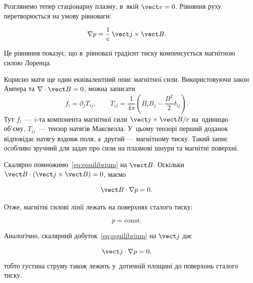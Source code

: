 Розглянемо тепер стаціонарну плазму, в~якій $\vect v=0$. Рівняння руху перетворюється на
умову рівноваги:

\begin{equation}\label{eq:equilibrium}
    \nabla p
    =
    \frac{1}{c}\,\vect j\times\vect B.
\end{equation}

Це рівняння показує, що в~рівновазі градієнт тиску компенсується магнітною силою Лоренца.

Корисно мати ще один еквівалентний опис магнітної сили. Використовуючи закон Ампера та
$\nabla\cdot\vect B=0$, можна записати
\begin{equation}\label{eq:maxwell-stress}
    f_i=\partial_jT_{ij},
    \qquad
    T_{ij}=
    \frac{1}{4\pi}
    \left(B_iB_j-\frac{B^2}{2}\delta_{ij}\right).
\end{equation}
Тут $f_i$~--- $i$-та компонента магнітної сили $\vect j\times\vect B/c$ на~одиницю об'єму, $T_{ij}$~--- тензор натягів Максвелла. У~цьому тензорі перший доданок відповідає натягу вздовж поля, а~другий --- магнітному
тиску. Такий запис особливо зручний для задач про сили на плазмові шнури та магнітні
поверхні.

Скалярно помножимо~\eqref{eq:equilibrium} на $\vect B$. Оскільки $\vect B\cdot(\vect
j\times\vect B)=0$, маємо

\begin{equation*}
    \vect B\cdot\nabla p=0.
\end{equation*}

Отже, магнітні силові лінії лежать на поверхнях сталого тиску:

\begin{equation*}
    p=\mathrm{const}.
\end{equation*}

Аналогічно, скалярний добуток~\eqref{eq:equilibrium} на $\vect j$ дає

\begin{equation*}
    \vect j\cdot\nabla p=0,
\end{equation*}
%
тобто густина струму також лежить у~дотичній площині до поверхонь сталого тиску.

